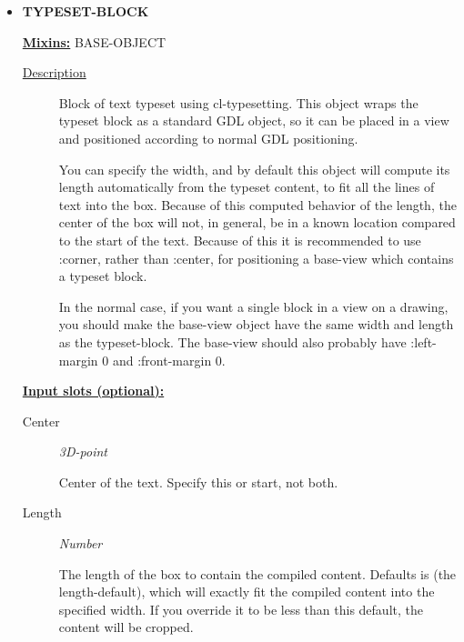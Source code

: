 \documentclass [11pt]{book}
\begin{document}
\begin{itemize}
\item {}
\label{prim:typeset-block}
\textbf{TYPESET-BLOCK}


\textbf{
\underline{Mixins:}} BASE-OBJECT





\begin{description}

\item [
\underline{Description}]


Block of text typeset using cl-typesetting. This object
wraps the typeset block as a standard GDL object, so it can be placed in a view and 
positioned according to normal GDL positioning.

You can specify the width, and by default this object will compute its length automatically 
from the typeset content, to fit all the lines of text into the box. Because of this 
computed behavior of the length, the center of the box will not, in general, be in a 
known location compared to the start of the text. Because of this it is recommended
to use :corner, rather than :center, for positioning a base-view which contains
a typeset block. 

In the normal case, if you want a single block in a view on a drawing, you should
make the base-view object have the same width and length as the typeset-block. The
base-view should also probably have :left-margin 0 and :front-margin 0.



\end{description}








\textbf{
\underline{Input slots (optional):}}

\begin{description}

\item [Center]
\emph{3D-point}

 Center of the text. Specify this or start, not both.




\item [Length]
\emph{Number}

 The length of the box to contain the compiled content. Defaults is (the length-default),
which will exactly fit the compiled content into the specified width. If you override it to be less
than this default, the content will be cropped.





\end{description}
\end{itemize}
\end{document}

